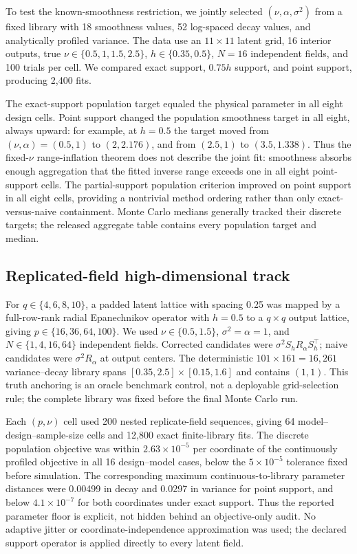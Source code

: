 \documentclass[sigconf]{acmart}
\theoremstyle{remark}
\begin{document}
To test the known-smoothness restriction, we jointly selected
\((\nu,\alpha,\sigma^2)\) from a fixed library with 18 smoothness values,
52 log-spaced decay values, and analytically profiled variance. The data use an
\(11\times11\) latent grid, 16 interior outputs, true
\(\nu\in\{0.5,1,1.5,2.5\}\), \(h\in\{0.35,0.5\}\), \(N=16\) independent
fields, and 100 trials per cell. We compared exact support, \(0.75h\) support,
and point support, producing 2,400 fits.

The exact-support population target equaled the physical parameter in all
eight design cells. Point support changed the population smoothness target in
all eight, always upward: for example, at \(h=0.5\) the target moved from
\((\nu,\alpha)=(0.5,1)\) to \((2,2.176)\), and from \((2.5,1)\) to
\((3.5,1.338)\). Thus the fixed-\(\nu\) range-inflation theorem does not
describe the joint fit: smoothness absorbs enough aggregation that the fitted
inverse range exceeds one in all eight point-support cells. The partial-support
population criterion improved on point support in all eight cells, providing a
nontrivial method ordering rather than only exact-versus-naive containment.
Monte Carlo medians generally tracked their discrete targets; the released
aggregate table contains every population target and median.

\subsection{Replicated-field high-dimensional track}

For \(q\in\{4,6,8,10\}\), a padded latent lattice with spacing 0.25 was mapped
by a full-row-rank radial Epanechnikov operator with \(h=0.5\) to a
\(q\times q\) output lattice, giving
\(p\in\{16,36,64,100\}\). We used \(\nu\in\{0.5,1.5\}\),
\(\sigma^2=\alpha=1\), and \(N\in\{1,4,16,64\}\) independent fields. Corrected
candidates were \(\sigma^2 S_h R_\alpha S_h^\top\); naive candidates were
\(\sigma^2 R_\alpha\) at output centers. The deterministic
\(101\times161=16{,}261\) variance--decay library spans
\([0.35,2.5]\times[0.15,1.6]\) and contains \((1,1)\). This truth anchoring
is an oracle benchmark control, not a deployable grid-selection rule; the
complete library was fixed before the final Monte Carlo run.

Each \((p,\nu)\) cell used 200 nested replicate-field sequences, giving 64
model--design--sample-size cells and 12,800 exact finite-library fits. The
discrete population objective was within \(2.63\times10^{-5}\) per coordinate
of the continuously profiled objective in all 16 design--model cases, below
the \(5\times10^{-5}\) tolerance fixed before simulation. The corresponding
maximum continuous-to-library parameter distances were 0.00499 in decay and
0.0297 in variance for point support, and below \(4.1\times10^{-7}\) for both
coordinates under exact support. Thus the reported parameter floor is explicit,
not hidden behind an objective-only audit. No adaptive jitter or
coordinate-independence approximation was used; the declared support operator
is applied directly to every latent field.
\end{document}
